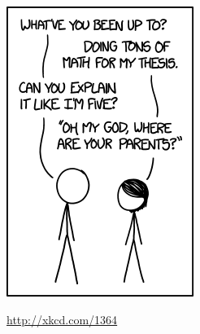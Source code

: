 \begin{marginfigure}
\includegraphics[width=0.75\linewidth]{graphics/like_im_five.png}
\caption{\url{http://xkcd.com/1364}}
\label{fig:xkcd1364}
\end{marginfigure}
